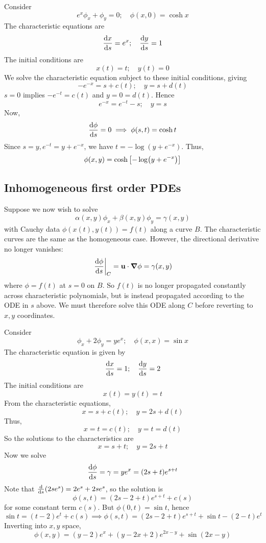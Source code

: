 \documentclass[a4paper]{article}
\begin{document}
\begin{example}
	Consider
	\[
		e^x \phi_x + \phi_y = 0;\quad \phi(x,0) = \cosh x
	\]
	The characteristic equations are
	\[
		\dv{x}{s} = e^x;\quad \dv{y}{s} = 1
	\]
	The initial conditions are
	\[
		x(t) = t;\quad y(t) = 0
	\]
	We solve the characteristic equation subject to these initial conditions, giving
	\[
		-e^{-x} = s + c(t);\quad y = s + d(t)
	\]
	\( s = 0 \) implies \( -e^{-t} = c(t) \) and \( y = 0 = d(t) \).
	Hence
	\[
		e^{-x} = e^{-t} - s;\quad y = s
	\]
	Now,
	\[
		\dv{\phi}{s} = 0 \implies \phi(s,t) = \cosh t
	\]
	Since \( s = y, e^{-t} = y + e^{-x} \), we have \( t = -\log(y + e^{-x}) \).
	Thus,
	\[
		\phi(x,y) = \cosh\qty[-\log(y + e^{-x})]
	\]
\end{example}

\subsection{Inhomogeneous first order PDEs}
Suppose we now wish to solve
\[
	\alpha(x,y) \phi_x + \beta(x,y) \phi_y = \gamma(x,y)
\]
with Cauchy data \( \phi(x(t), y(t)) = f(t) \) along a curve \( B \).
The characteristic curves are the same as the homogeneous case.
However, the directional derivative no longer vanishes:
\[
	\eval{\dv{\phi}{s}}_C = \bfu \cdot \grad{\phi} = \gamma(x,y)
\]
where \( \phi = f(t) \) at \( s = 0 \) on \( B \).
So \( f(t) \) is no longer propagated constantly across characteristic polynomials, but is instead propagated according to the ODE in \( s \) above.
We must therefore solve this ODE along \( C \) before reverting to \( x,y \) coordinates.
\begin{example}
	Consider
	\[
		\phi_x + 2 \phi_y = ye^x;\quad \phi(x,x) = \sin x
	\]
	The characteristic equation is given by
	\[
		\dv{x}{s} = 1;\quad \dv{y}{s} = 2
	\]
	The initial conditions are
	\[
		x(t) = y(t) = t
	\]
	From the characteristic equations,
	\[
		x = s + c(t);\quad y = 2s + d(t)
	\]
	Thus,
	\[
		x = t = c(t);\quad y = t = d(t)
	\]
	So the solutions to the characteristics are
	\[
		x = s + t;\quad y = 2s + t
	\]
	Now we solve
	\[
		\dv{\phi}{s} = \gamma = y e^x = (2s+t)e^{s+t}
	\]
	Note that \( \dv{s} \qty(2se^s) = 2e^s + 2se^s \), so the solution is
	\[
		\phi(s,t) = (2s - 2 + t)e^{s+t} + c(s)
	\]
	for some constant term \( c(s) \).
	But \( \phi(0,t) = \sin t \), hence
	\[
		\sin t = (t-2)e^t + c(s) \implies \phi(s,t) = (2s-2+t)e^{s+t} + \sin t - (2-t)e^t
	\]
	Inverting into \( x,y \) space,
	\[
		\phi(x,y) = (y-2)e^x + (y-2x+2)e^{2x-y} + \sin(2x-y)
	\]
\end{example}
\end{document}
